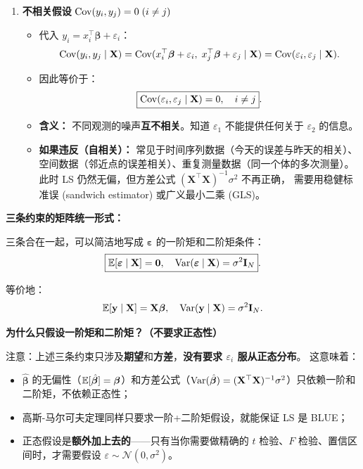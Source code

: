 \begin{enumerate}[label=\textbf{假设 \arabic*:}, leftmargin=*]
    \item \textbf{不相关假设} $\mathrm{Cov}(y_i, y_j) = 0\;(i \neq j)$

    \begin{itemize}
        \item 代入 $y_i = x_i^\top \bm{\beta} + \varepsilon_i$：
        \[
            \mathrm{Cov}(y_i, y_j \mid \mathbf{X})
            = \mathrm{Cov}(x_i^\top \bm{\beta} + \varepsilon_i,\;
                     x_j^\top \bm{\beta} + \varepsilon_j \mid \mathbf{X})
            = \mathrm{Cov}(\varepsilon_i, \varepsilon_j \mid \mathbf{X}).
        \]
        \item 因此等价于：
        \[
            \boxed{\mathrm{Cov}(\varepsilon_i, \varepsilon_j \mid \mathbf{X}) = 0,\quad i \neq j}.
        \]
        \item \textbf{含义：} 不同观测的噪声\textbf{互不相关}。知道 $\varepsilon_1$ 不能提供任何关于 $\varepsilon_2$ 的信息。
        \item \textbf{如果违反（自相关）：} 常见于时间序列数据（今天的误差与昨天的相关）、
        空间数据（邻近点的误差相关）、重复测量数据（同一个体的多次测量）。
        此时 LS 仍然无偏，但方差公式 $(\mathbf{X}^\top \mathbf{X})^{-1}\sigma^2$ 不再正确，
        需要用稳健标准误 (sandwich estimator) 或广义最小二乘 (GLS)。
    \end{itemize}

\end{enumerate}

\medskip
\noindent
\textbf{三条约束的矩阵统一形式：}

三条合在一起，可以简洁地写成 $\bm{\varepsilon}$ 的一阶矩和二阶矩条件：
\begin{equation}\label{eq:epsilon_moments}
    \boxed{\mathbb{E}[\bm{\varepsilon} \mid \mathbf{X}] = \mathbf{0},
           \quad \mathrm{Var}(\bm{\varepsilon} \mid \mathbf{X}) = \sigma^2 \mathbf{I}_N}.
\end{equation}

等价地：
\[
    \mathbb{E}[\mathbf{y} \mid \mathbf{X}] = \mathbf{X}\bm{\beta},
    \quad \mathrm{Var}(\mathbf{y} \mid \mathbf{X}) = \sigma^2 \mathbf{I}_N.
\]

\medskip
\noindent
\textbf{为什么只假设一阶矩和二阶矩？（不要求正态性）}

注意：上述三条约束只涉及\textbf{期望}和\textbf{方差}，\textbf{没有要求 $\varepsilon_i$ 服从正态分布}。
这意味着：
\begin{itemize}
    \item $\hat{\bm{\beta}}$ 的无偏性（$\mathbb{E}[\hat{\bm{\beta}}] = \bm{\beta}$）和方差公式（$\mathrm{Var}(\hat{\bm{\beta}}) = (\mathbf{X}^\top \mathbf{X})^{-1}\sigma^2$）只依赖一阶和二阶矩，不依赖正态性；
    \item 高斯-马尔可夫定理同样只要求一阶+二阶矩假设，就能保证 LS 是 BLUE；
    \item 正态假设是\textbf{额外加上去的}——只有当你需要做精确的 $t$ 检验、$F$ 检验、置信区间时，才需要假设 $\varepsilon \sim \mathcal{N}(0, \sigma^2)$。
\end{itemize}

